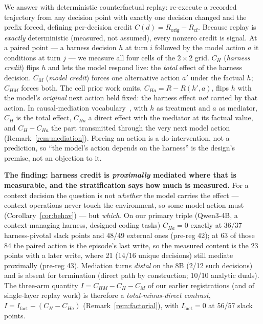 \documentclass{article}
\theoremstyle{remark}
\begin{document}
We answer with deterministic counterfactual replay: re-execute a recorded
trajectory from any decision point with exactly one decision changed and
the prefix forced, defining per-decision credit $C(d) = R_{\text{orig}} -
R_{\text{cf}}$. Because replay is \emph{exactly} deterministic (measured,
not assumed), every nonzero credit is signal. At a paired point --- a
harness decision $h$ at turn $i$ followed by the model action $a$ it
conditions at turn $j$ --- we measure all four cells of the $2\times 2$
grid. $C_H$ (\emph{harness credit}) flips $h$ and lets the model respond
live: the \emph{total} effect of the harness decision. $C_M$
(\emph{model credit}) forces one alternative action $a'$ under the
factual $h$; $C_{HM}$ forces both. The cell prior work omits, $C_{Ha} = R
- R(h',a)$, flips $h$ with the model's \emph{original} next action held
fixed: the harness effect \emph{not} carried by that action. In
causal-mediation vocabulary~\citep{pearl2001direct}, with $h$ as
treatment and $a$ as mediator, $C_H$ is the total effect, $C_{Ha}$ a
direct effect with the mediator at its factual value, and $C_H - C_{Ha}$
the part transmitted through the very next model action
(Remark~\ref{rem:mediation}). Forcing an action is a do-intervention, not
a prediction, so ``the model's action depends on the harness'' is the
design's premise, not an objection to it.

\textbf{The finding: harness credit is \emph{proximally} mediated where
that is measurable, and the stratification says how much is measured.}
For a context decision the question is not \emph{whether} the model
carries the effect --- context operations never touch the environment,
so some model action must (Corollary~\ref{cor:behav}) --- but
\emph{which}. On our primary triple (Qwen3-4B, a context-managing
harness, designed coding tasks) $C_{Ha} = 0$ exactly at 36/37
harness-pivotal slack points and 48/49 external ones (pre-reg 42); at 63
of those 84 the paired action is the episode's last write, so the
measured content is the 23 points with a later write, where 21 (14/16
unique decisions) still mediate proximally (pre-reg 43). Mediation turns
\emph{distal} on the 8B (2/12 such decisions) and is absent for
termination (direct path by construction; 10/10 analytic duals). The
three-arm quantity $I = C_{HM} - C_H - C_M$ of our earlier registrations
(and of single-layer replay work) is therefore a
\emph{total-minus-direct contrast}, $I = I_{\text{fact}} - (C_H -
C_{Ha})$ (Remark~\ref{rem:factorial}), with $I_{\text{fact}} = 0$ at
56/57 slack points.
\end{document}
